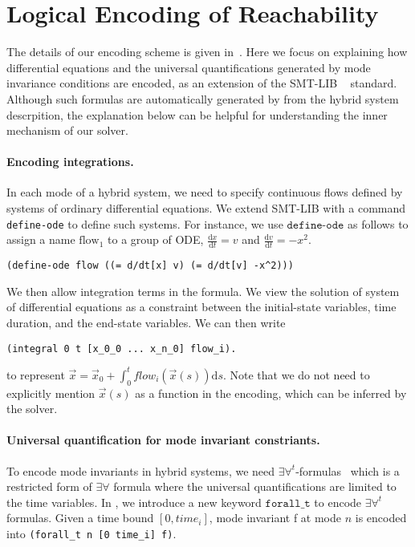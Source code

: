 \section{Logical Encoding of Reachability}


The details of our encoding scheme is given in~\cite{DBLP:journals/corr/GaoKCC14}.
Here we focus on explaining how differential equations and the universal quantifications
generated by mode invariance conditions are encoded, as an extension of the SMT-LIB
~\cite{BarST-SMT-10} standard. Although such formulas are automatically generated by \dReach{}
from the hybrid system descrpition, the explanation below can be helpful for
understanding the inner mechanism of our solver.

\paragraph{Encoding integrations.}
In each mode of a hybrid system, we need to specify continuous flows defined
by systems of ordinary differential equations. We extend SMT-LIB with a command
\texttt{define-ode} to define such systems. For instance, we use $\texttt{define-ode}$ as follows to
assign a name $\mathrm{flow_1}$ to a group of ODE,
$\frac{\mathrm{d}x}{\mathrm{d}t} = v$ and
$\frac{\mathrm{d}v}{\mathrm{d}t} = -x^2$.
\begin{Verbatim}[fontfamily=courier, fontsize=\small]
(define-ode flow ((= d/dt[x] v) (= d/dt[v] -x^2)))
\end{Verbatim}
We then allow integration terms in the formula. We view the solution of system of differential equations
as a constraint between the initial-state variables, time duration, and the end-state variables. We can then write
\begin{Verbatim}[fontfamily=courier, fontsize=\small]
(integral 0 t [x_0_0 ... x_n_0] flow_i).
\end{Verbatim}
to represent
$\vec x = \vec x_0 + \int_0^t flow_i(\vec x(s))\mathrm{d}s$. Note that we do not need to explicitly mention $\vec x(s)$ as a function in the encoding, which can be inferred by the solver.

\paragraph{Universal quantification for mode invariant constriants.} To encode mode invariants in hybrid systems, we
need $\exists\forall^t$-formulas~\cite{DBLP:conf/fmcad/GaoKC13} which
is a restricted form of $\exists\forall$ formula where the universal
quantifications are limited to the time variables. In \drh{}, we
introduce a new keyword $\texttt{forall\_t}$ to encode
$\exists\forall^t$ formulas. Given a time bound $[0, time_i]$, mode
invariant f at mode $n$ is encoded into \texttt{(forall\_t n [0
  time\_i] f)}.

